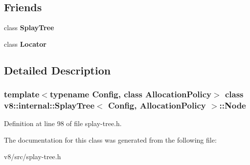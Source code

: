 \subsection*{Friends}
\begin{DoxyCompactItemize}
\item 
\mbox{\label{classv8_1_1internal_1_1SplayTree_1_1Node_a2070fb75b364a2c030d578a4b59fa43b}} 
class {\bfseries Splay\+Tree}
\item 
\mbox{\label{classv8_1_1internal_1_1SplayTree_1_1Node_ae6c3d73810195cfbdd05d23c5389df89}} 
class {\bfseries Locator}
\end{DoxyCompactItemize}


\subsection{Detailed Description}
\subsubsection*{template$<$typename Config, class Allocation\+Policy$>$\newline
class v8\+::internal\+::\+Splay\+Tree$<$ Config, Allocation\+Policy $>$\+::\+Node}



Definition at line 98 of file splay-\/tree.\+h.



The documentation for this class was generated from the following file\+:\begin{DoxyCompactItemize}
\item 
v8/src/splay-\/tree.\+h\end{DoxyCompactItemize}
